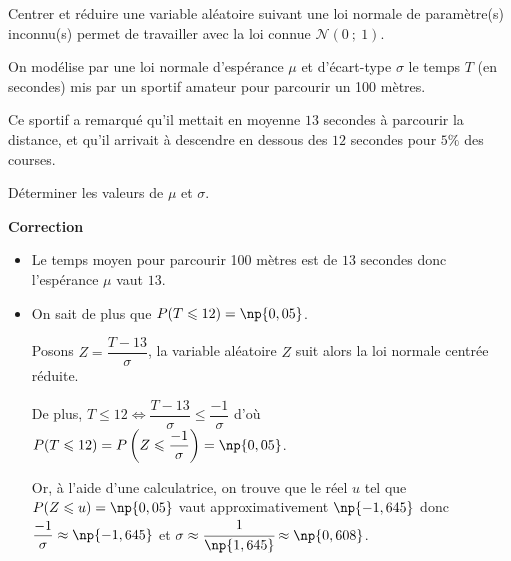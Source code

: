 \documentclass{cornouaille}
\begin{document}
\begin{methode}
Centrer et réduire une variable aléatoire suivant une loi normale de paramètre(s) inconnu(s) permet de travailler avec la loi connue $\mathcal{N}(0\ ;\ 1)$.

\exercice\label{methode6SP2} On modélise par une loi normale
d'espérance $\mu$ et d'écart-type $\sigma$ le temps $T$ (en secondes)
mis par un sportif amateur pour parcourir un 100 mètres.

Ce sportif a remarqué qu'il mettait en moyenne $13$ secondes à
parcourir la distance, et qu'il arrivait à descendre en dessous des
$12$ secondes pour $5\%$ des courses.

Déterminer les valeurs de $\mu$ et $\sigma$.

\textbf{Correction}

\begin{itemize}
	\item Le temps moyen pour parcourir 100 mètres est de $13$ secondes donc l'espérance $\mu$ vaut $13$.
	\item On sait de plus que $P(T\leqslant 12 )=\np{0,05}$.
	
	Posons $Z=\dfrac{T-13}{\sigma}$, la variable aléatoire $Z$ suit alors la loi normale centrée réduite.
	
	De plus, $T\leqslant 12 \Leftrightarrow \dfrac{T-13}{\sigma}\leqslant  \dfrac{-1}{\sigma}$ d'où $P(T\leqslant 12 )=P\left(Z\leqslant \dfrac{-1}{\sigma}\right)=\np{0,05}$.
	
	Or, à l'aide d'une calculatrice, on trouve que le réel $u$ tel que $P(Z\leqslant u)=\np{0,05}$ vaut approximativement $\np{-1,645}$ donc $\dfrac{-1}{\sigma}\approx\np{-1,645}$ et $\sigma\approx\cfrac{1}{\np{1,645}}\approx\np{0,608}$.
\end{itemize}



~~
\end{methode}

\end{document}

